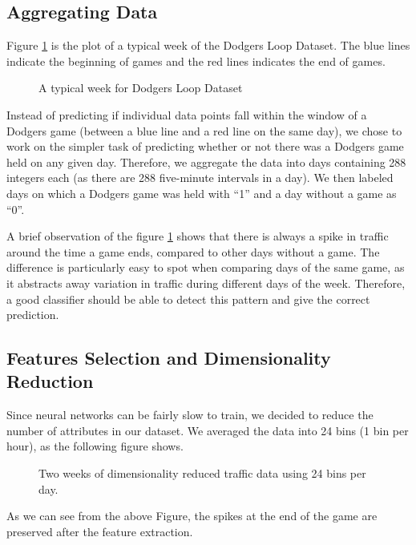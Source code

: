 \documentclass[conference]{IEEEtran}
\begin{document}
		\subsection{Aggregating Data}
		
		Figure \ref{fig:typical-week} is the plot of a typical week of the Dodgers Loop Dataset. The blue lines indicate the beginning of games and the red lines indicates the end of games. 
		
		\begin{figure}[H]
			\centering
			\caption{A typical week for Dodgers Loop Dataset}
			\label{fig:typical-week}
		\end{figure}
		
		Instead of predicting if individual data points fall within the window of a Dodgers game (between a blue line and a red line on the same day), we chose to work on the simpler task of predicting whether or not there was a Dodgers game held on any given day.
		Therefore, we aggregate the data into days containing 288 integers each (as there are 288 five-minute intervals in a day). We then labeled days on which a Dodgers game was held with ``1'' and a day without a game as ``0''. 
		
		A brief observation of the figure \ref{fig:typical-week} shows that there is always a spike in traffic around the time a game ends, compared to other days without a game. The difference is particularly easy to spot when comparing days of the same game, as it abstracts away variation in traffic during different days of the week. Therefore, a good classifier should be able to detect this pattern and give the correct prediction.
		
		\subsection{Features Selection and Dimensionality Reduction}
		Since neural networks can be fairly slow to train, we decided to reduce the number of attributes in our dataset. We averaged the data into 24 bins (1 bin per hour), as the following figure shows.
		
		\begin{figure}[H]
			\caption{Two weeks of dimensionality reduced traffic data using 24 bins per day.}
			\label{fig:two-weeks-reduced-dimensionality}
		\end{figure}
		As we can see from the above Figure, the spikes at the end of the game are preserved after the feature extraction.
		
\end{document}
